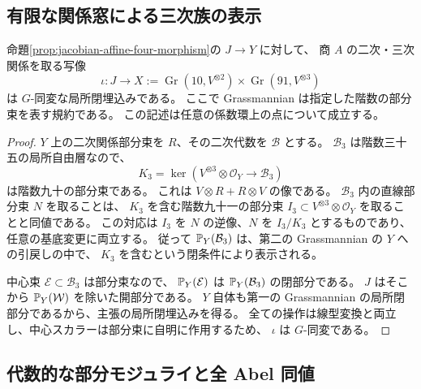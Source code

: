 \subsection{有限な関係窓による三次族の表示}

\begin{lemma}[中心三次直線の関係窓への埋込み]
\label{lem:jacobian-relation-window-immersion}
命題\ref{prop:jacobian-affine-four-morphism}の $J\to Y$ に対して、
商 $A$ の二次・三次関係を取る写像
\[
 \iota:J\longrightarrow
 X:=\operatorname{Gr}(10,V^{\otimes2})
       \times\operatorname{Gr}(91,V^{\otimes3})
\]
は $G$-同変な局所閉埋込みである。
ここで Grassmannian は指定した階数の部分束を表す規約である。
この記述は任意の係数環上の点について成立する。
\end{lemma}

\begin{proof}
$Y$ 上の二次関係部分束を $R$、その二次代数を $\mathcal B$ とする。
$\mathcal B_3$ は階数三十五の局所自由層なので、
\[
 K_3=\ker(V^{\otimes3}\otimes\mathcal O_Y\to\mathcal B_3)
\]
は階数九十の部分束である。
これは $V\otimes R+R\otimes V$ の像である。
$\mathcal B_3$ 内の直線部分束 $N$ を取ることは、
$K_3$ を含む階数九十一の部分束 $I_3\subset V^{\otimes3}\otimes\mathcal O_Y$ を取ることと同値である。
この対応は $I_3$ を $N$ の逆像、$N$ を $I_3/K_3$ とするものであり、
任意の基底変更に両立する。
従って $\mathbb P_Y(\mathcal B_3)$ は、第二の Grassmannian の $Y$ への引戻しの中で、
$K_3$ を含むという閉条件により表示される。

中心束 $\mathcal E\subset\mathcal B_3$ は部分束なので、
$\mathbb P_Y(\mathcal E)$ は $\mathbb P_Y(\mathcal B_3)$ の閉部分である。
$J$ はそこから $\mathbb P_Y(\mathcal W)$ を除いた開部分である。
$Y$ 自体も第一の Grassmannian の局所閉部分であるから、主張の局所閉埋込みを得る。
全ての操作は線型変換と両立し、中心スカラーは部分束に自明に作用するため、
$\iota$ は $G$-同変である。
\end{proof}

\subsection{代数的な部分モジュライと全 Abel 同値}

